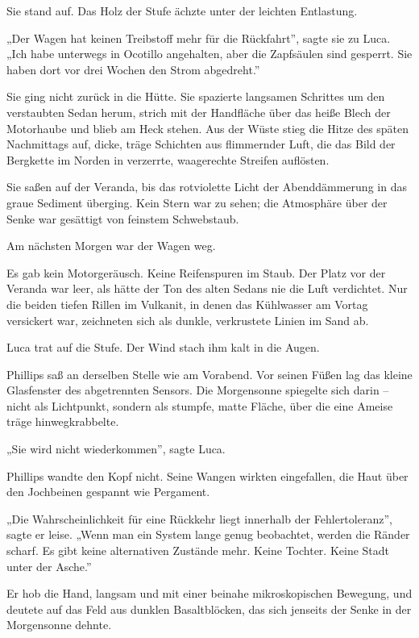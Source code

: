 \documentclass[
  ngerman,
]{article}
\begin{document}
Sie stand auf. Das Holz der Stufe ächzte unter der leichten Entlastung.

„Der Wagen hat keinen Treibstoff mehr für die Rückfahrt'', sagte sie zu
Luca. „Ich habe unterwegs in Ocotillo angehalten, aber die Zapfsäulen
sind gesperrt. Sie haben dort vor drei Wochen den Strom abgedreht.''

Sie ging nicht zurück in die Hütte. Sie spazierte langsamen Schrittes um
den verstaubten Sedan herum, strich mit der Handfläche über das heiße
Blech der Motorhaube und blieb am Heck stehen. Aus der Wüste stieg die
Hitze des späten Nachmittags auf, dicke, träge Schichten aus flimmernder
Luft, die das Bild der Bergkette im Norden in verzerrte, waagerechte
Streifen auflösten.

Sie saßen auf der Veranda, bis das rotviolette Licht der Abenddämmerung
in das graue Sediment überging. Kein Stern war zu sehen; die Atmosphäre
über der Senke war gesättigt von feinstem Schwebstaub.

Am nächsten Morgen war der Wagen weg.

Es gab kein Motorgeräusch. Keine Reifenspuren im Staub. Der Platz vor
der Veranda war leer, als hätte der Ton des alten Sedans nie die Luft
verdichtet. Nur die beiden tiefen Rillen im Vulkanit, in denen das
Kühlwasser am Vortag versickert war, zeichneten sich als dunkle,
verkrustete Linien im Sand ab.

Luca trat auf die Stufe. Der Wind stach ihm kalt in die Augen.

Phillips saß an derselben Stelle wie am Vorabend. Vor seinen Füßen lag
das kleine Glasfenster des abgetrennten Sensors. Die Morgensonne
spiegelte sich darin -- nicht als Lichtpunkt, sondern als stumpfe, matte
Fläche, über die eine Ameise träge hinwegkrabbelte.

„Sie wird nicht wiederkommen'', sagte Luca.

Phillips wandte den Kopf nicht. Seine Wangen wirkten eingefallen, die
Haut über den Jochbeinen gespannt wie Pergament.

„Die Wahrscheinlichkeit für eine Rückkehr liegt innerhalb der
Fehlertoleranz'', sagte er leise. „Wenn man ein System lange genug
beobachtet, werden die Ränder scharf. Es gibt keine alternativen
Zustände mehr. Keine Tochter. Keine Stadt unter der Asche.''

Er hob die Hand, langsam und mit einer beinahe mikroskopischen Bewegung,
und deutete auf das Feld aus dunklen Basaltblöcken, das sich jenseits
der Senke in der Morgensonne dehnte.
\end{document}
